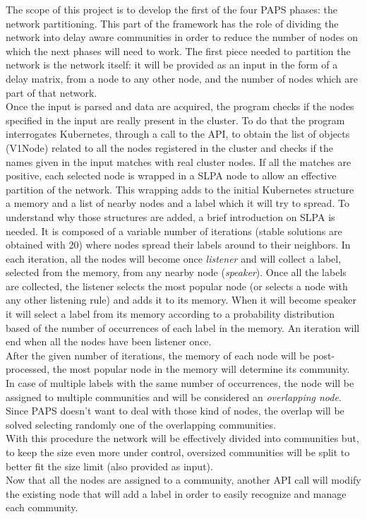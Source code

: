 The scope of this project is to develop the first of the four PAPS phases: the network 
partitioning. This part of the framework has the role of dividing the network into 
delay aware communities in order to reduce the number of nodes on which the next phases
will need to work. The first piece needed to partition the network is the network itself:
it will be provided as an input in the form of a delay matrix, from a node to any other
node, and the number of nodes which are part of that network. \\ 
Once the input is parsed and data are acquired, the program checks if the nodes specified 
in the input are really present in the cluster. To do that the program interrogates 
Kubernetes, through a call to the API, to obtain the list of objects (V1Node) related to
all the nodes registered in the cluster and checks if the names given in the
input matches with real cluster nodes. If all the matches are positive, each selected 
node is wrapped in a SLPA \cite{SLPA} node to allow an effective partition of the network.
This wrapping adds to the initial Kubernetes structure a memory and a list of nearby 
nodes and a label which it will try to spread. To understand why those structures are 
added, a brief introduction on SLPA is needed. It is composed of a variable number of 
iterations (stable solutions are obtained with 20) where nodes spread their labels 
around to their neighbors. In each iteration, all the nodes will become once 
\textit{listener} and will collect a label, selected from the memory, from any nearby 
node (\textit{speaker}). Once all the labels are collected, the listener selects the 
most popular node (or selects a node with any other listening rule) and adds it to its
memory. When it will become speaker it will select a label from its memory according 
to a probability distribution based of the number of occurrences of each label in the 
memory. An iteration will end when all the nodes have been listener once. \\
After the given number of iterations, the memory of each node will be post-processed, 
the most popular node in the memory will determine its community. In case of multiple
labels with the same number of occurrences, the node will be assigned to multiple 
communities and will be considered an \textit{overlapping node}. Since PAPS doesn't 
want to deal with those kind of nodes, the overlap will be solved selecting randomly 
one of the overlapping communities. \\
With this procedure the network will be effectively divided into communities but, 
to keep the size even more under control, oversized communities will be split to better
fit the size limit (also provided as input). \\
Now that all the nodes are assigned to a community, another API call will modify the
existing node that will add a label in order to easily recognize and manage each community.

